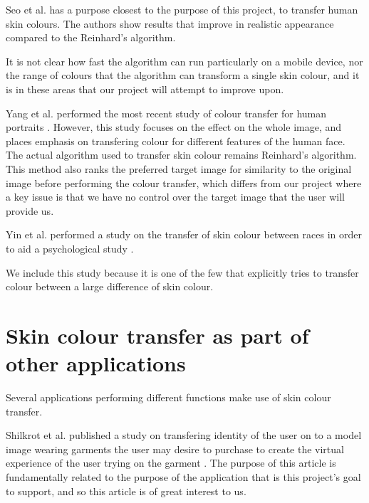 Seo et al. \cite{seo_2005_transfer} has a purpose closest to the purpose of this project, to transfer human skin colours. The authors show results that improve in realistic appearance compared to the Reinhard's algorithm.


It is not clear how fast the algorithm can run particularly on a mobile device, nor the range of colours that the algorithm can transform a single skin colour, and it is in these areas that our project will attempt to improve upon.

Yang et al. performed the most recent study of colour transfer for human portraits \cite{yang_2015_semantic}. However, this study focuses on the effect on the whole image, and places emphasis on transfering colour for different features of the human face. The actual algorithm used to transfer skin colour remains Reinhard's algorithm. This method also ranks the preferred target image for similarity to the original image before performing the colour transfer, which differs from our project where a key issue is that we have no control over the target image that the user will provide us. 

Yin et al. performed a study on the transfer of skin colour between races in order to aid a psychological study \cite{yin_2004_transfer}. 


We include this study because it is one of the few that explicitly tries to transfer colour between a large difference of skin colour.

\section{Skin colour transfer as part of other applications}
Several applications performing different functions make use of skin colour transfer.

Shilkrot et al. published a study on transfering identity of the user on to a model image wearing garments the user may desire to purchase to create the virtual experience of the user trying on the garment \cite{shilkrot_2013_garment}. The purpose of this article is fundamentally related to the purpose of the application that is this project's goal to support, and so this article is of great interest to us. 

